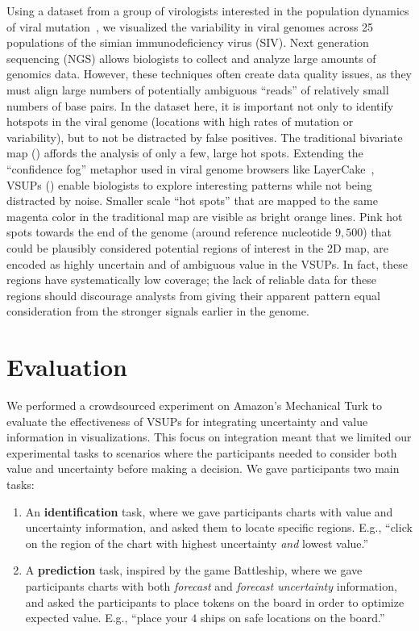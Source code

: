 \viralFig

Using a dataset from a group of virologists interested in the population dynamics of viral mutation~\cite{o2012conditional}, we visualized the variability in viral genomes across 25 populations of the simian immunodeficiency virus (SIV). Next generation sequencing (NGS) allows biologists to collect and analyze large amounts of genomics data. However, these techniques often create data quality issues, as they must align large numbers of potentially ambiguous ``reads'' of relatively small numbers of base pairs. In the dataset here, it is important not only to identify hotspots in the viral genome (locations with high rates of mutation or variability), but to not be distracted by false positives. The traditional bivariate map () affords the analysis of only a few, large hot spots. Extending the ``confidence fog'' metaphor used in viral genome browsers like LayerCake~\cite{correll2015layercake}, VSUPs () enable biologists to explore interesting patterns while not being distracted by noise. Smaller scale ``hot spots'' that are mapped to the same magenta color in the traditional map are visible as bright orange lines. Pink hot spots towards the end of the genome (around reference nucleotide $9,500$) that could be plausibly considered potential regions of interest in the 2D map, are encoded as highly uncertain and of ambiguous value in the VSUPs. In fact, these regions have systematically low coverage; the lack of reliable data for these regions should discourage analysts from giving their apparent pattern equal consideration from the  stronger signals earlier in the genome.

\section{Evaluation}

\conditionFig

We performed a crowdsourced experiment on Amazon's Mechanical Turk to evaluate the effectiveness of VSUPs for integrating uncertainty and value information in visualizations. This focus on integration meant that we limited our experimental tasks to scenarios where the participants needed to consider both value and uncertainty before making a decision. We gave participants two main tasks:

\begin{enumerate}
	\item An \textbf{identification} task, where we gave participants charts with value and uncertainty information, and asked them to locate specific regions. E.g., ``click on the region of the chart with highest uncertainty \emph{and} lowest value.''
	\item A \textbf{prediction} task, inspired by the game Battleship, where we gave participants charts with both \emph{forecast} and \emph{forecast uncertainty} information, and asked the participants to place tokens on the board in order to optimize expected value. E.g., ``place your $4$ ships on safe locations on the board.''
\end{enumerate}

